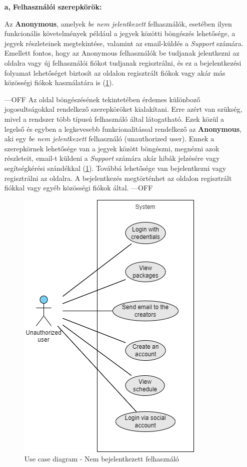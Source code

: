 \begin{itemize}
  \item[\textbf{a,}] \textbf{Felhasználói szerepkörök:}

Az \textbf{Anonymous}, amelyek \textit{be nem jelentkezett} felhasználók, esetében ilyen funkcionális követelmények például a jegyek közötti böngészés lehetősége, a jegyek részleteinek megtekintése, valamint az email-küldés a \textit{Support} számára. Emellett fontos, hogy az Anonymous felhasználók be tudjanak jelentkezni az oldalra vagy új felhasználói fiókot tudjanak regisztrálni, és ez a bejelentkezési folyamat lehetőséget biztosít az oldalon regisztrált fiókok vagy akár más közösségi fiókok használatára is (\ref{abra:useCaseNA}).

---OFF
Az oldal böngészésének tekintetében érdemes különboző jogosultságokkal rendelkező szerepköröket kialakítani. Erre azért van szükség, mivel a rendszer több típusú felhasználó által látogatható. Ezek közül a legelső és egyben a legkevesebb funkcionalitással rendelkező az \textbf{Anonymous}, aki egy \textit{be nem jelentkezett} felhasználó (unauthorized user). Ennek a szerepkörnek lehetősége van a jegyek között böngészni, megnézni azok részleteit, email-t küldeni a \textit{Support} számára akár hibák jelzésére vagy segítségkérési szándékkal (\ref{abra:useCaseNA}). Továbbá lehetősége van bejelentkezni vagy regisztrálni az oldalra. A bejelentkezés megtörténhet az oldalon regisztrált fiókkal vagy egyéb közösségi fiókok által.
---OFF

\begin{figure}[!h]
	\centering
	\includegraphics[scale=0.7]{images/useCaseNA}
	\caption{Use case diagram - Nem bejelentkezett felhasználó}
	\label{abra:useCaseNA}
\end{figure}
\pagebreak


\end{itemize}
